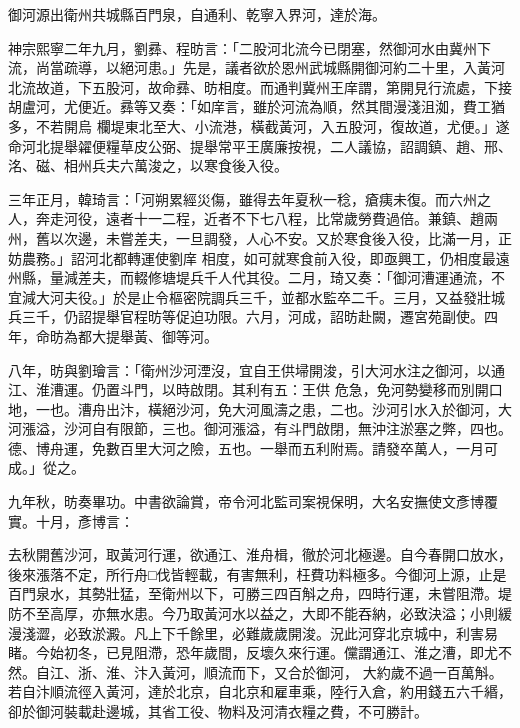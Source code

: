 \begin{pinyinscope}
 御河源出衛州共城縣百門泉，自通利、乾寧入界河，達於海。



 神宗熙寧二年九月，劉彞、程昉言：「二股河北流今已閉塞，然御河水由冀州下流，尚當疏導，以絕河患。」先是，議者欲於恩州武城縣開御河約二十里，入黃河北流故道，下五股河，故命彞、昉相度。而通判冀州王庠謂，第開見行流處，下接胡盧河，尤便近。彞等又奏：「如庠言，雖於河流為順，然其間漫淺沮洳，費工猶多，不若開烏
 欄堤東北至大、小流港，橫截黃河，入五股河，復故道，尤便。」遂命河北提舉糴便糧草皮公弼、提舉常平王廣廉按視，二人議協，詔調鎮、趙、邢、洺、磁、相州兵夫六萬浚之，以寒食後入役。



 三年正月，韓琦言：「河朔累經災傷，雖得去年夏秋一稔，瘡痍未復。而六州之人，奔走河役，遠者十一二程，近者不下七八程，比常歲勞費過倍。兼鎮、趙兩州，舊以次邊，未嘗差夫，一旦調發，人心不安。又於寒食後入役，比滿一月，正妨農務。」詔河北都轉運使劉庠
 相度，如可就寒食前入役，即亟興工，仍相度最遠州縣，量減差夫，而輟修塘堤兵千人代其役。二月，琦又奏：「御河漕運通流，不宜減大河夫役。」於是止令樞密院調兵三千，並都水監卒二千。三月，又益發壯城兵三千，仍詔提舉官程昉等促迫功限。六月，河成，詔昉赴闕，遷宮苑副使。四年，命昉為都大提舉黃、御等河。



 八年，昉與劉璯言：「衛州沙河湮沒，宜自王供埽開浚，引大河水注之御河，以通江、淮漕運。仍置斗門，以時啟閉。其利有五：王供
 危急，免河勢變移而別開口地，一也。漕舟出汴，橫絕沙河，免大河風濤之患，二也。沙河引水入於御河，大河漲溢，沙河自有限節，三也。御河漲溢，有斗門啟閉，無沖注淤塞之弊，四也。德、博舟運，免數百里大河之險，五也。一舉而五利附焉。請發卒萬人，一月可成。」從之。



 九年秋，昉奏畢功。中書欲論賞，帝令河北監司案視保明，大名安撫使文彥博覆實。十月，彥博言：



 去秋開舊沙河，取黃河行運，欲通江、淮舟楫，徹於河北極邊。自今春開口放水，
 後來漲落不定，所行舟□伐皆輕載，有害無利，枉費功料極多。今御河上源，止是百門泉水，其勢壯猛，至衛州以下，可勝三四百斛之舟，四時行運，未嘗阻滯。堤防不至高厚，亦無水患。今乃取黃河水以益之，大即不能吞納，必致決溢；小則緩漫淺澀，必致淤澱。凡上下千餘里，必難歲歲開浚。況此河穿北京城中，利害易睹。今始初冬，已見阻滯，恐年歲間，反壞久來行運。儻謂通江、淮之漕，即尤不然。自江、浙、淮、汴入黃河，順流而下，又合於御河，
 大約歲不過一百萬斛。若自汴順流徑入黃河，達於北京，自北京和雇車乘，陸行入倉，約用錢五六千緡，卻於御河裝載赴邊城，其省工役、物料及河清衣糧之費，不可勝計。




\end{pinyinscope}
